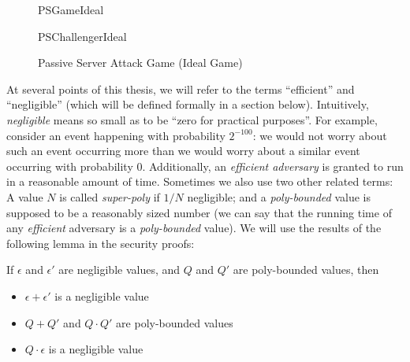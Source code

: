 \begin{figure}[!h]
  \centering
  \begin{center}
    \begin{bbrenv}{PSGameIdeal}
      \begin{bbrbox}[name=Adversary, minheight=2cm]
        
      \end{bbrbox}
      \begin{bbrchallenger}{PSChallengerIdeal}
        \begin{bbrbox}[name=Challenger]
        \end{bbrbox}
      \end{bbrchallenger}
    \end{bbrenv}
  \end{center}
  \caption{Passive Server Attack Game (Ideal Game)}
  \label{fig:passiveServerGameIdeal}
\end{figure}

At several points of this thesis, we will refer to the terms ``efficient'' and
``negligible'' (which will be defined formally in a section below). Intuitively,
\textit{negligible} means so small as to be ``zero for practical purposes''. For
example, consider an event happening with probability \(2^{-100}\): we would
not worry about such an event occurring more than we would worry about a similar
event occurring with probability 0. Additionally, an \textit{efficient
  adversary} is granted to run in a reasonable amount of time. Sometimes we
also use two other related terms: A value \(N\) is called \textit{super-poly} if
\(1/N\) negligible; and a \textit{poly-bounded} value is supposed to be a reasonably sized
number (we can say that the running time of any \textit{efficient} adversary is
a \textit{poly-bounded} value). We will use the results of the following lemma in
the security proofs:
\begin{lemma}
  If \(\epsilon\) and \(\epsilon'\) are negligible values, and \(Q\) and \(Q'\)
  are poly-bounded values, then
  \begin{itemize}
  \item \(\epsilon + \epsilon'\) is a negligible value
  \item \(Q + Q'\) and \(Q \cdot Q'\) are poly-bounded values
  \item \(Q \cdot \epsilon\) is a negligible value
  \end{itemize}
\end{lemma}

